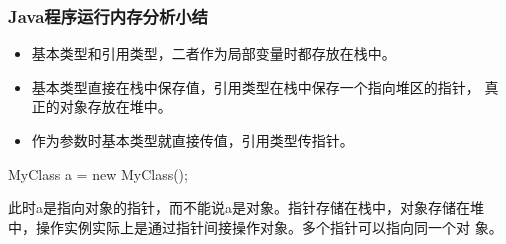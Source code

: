 
\begin{frame}[fragile] %

  \frametitle{Java程序运行内存分析小结}
  \begin{itemize}[<+-| structure@+>]\kai
  \item 基本类型和引用类型，二者作为局部变量时都存放在栈中。
  \item 基本类型直接在栈中保存值，引用类型在栈中保存一个指向堆区的指针，
    真正的对象存放在堆中。
  \item 作为参数时基本类型就直接传值，引用类型传指针。
  \end{itemize}

  \pause
  
  
  \begin{javaCode}
    MyClass a = new MyClass();
  \end{javaCode}
  
  此时a是指向对象的指针，而不能说a是对象。指针存储在栈中，对象存储在堆
  中，操作实例实际上是通过指针间接操作对象。多个指针可以指向同一个对
  象。

\end{frame}

